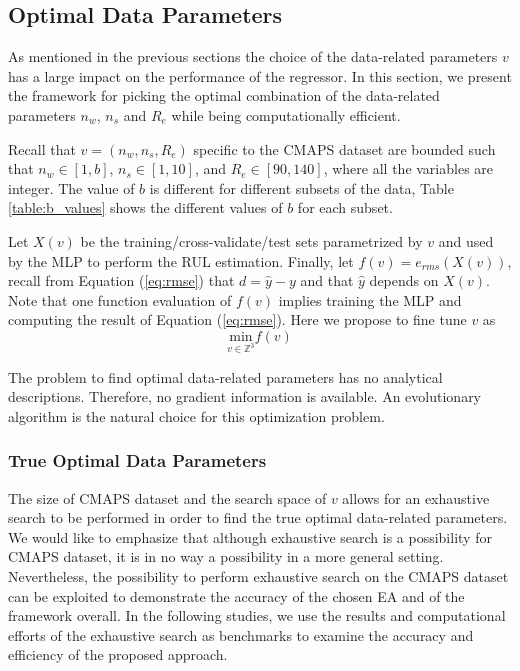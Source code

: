\documentclass[12pt]{IEEEtran}%
\begin{document}
\subsection{Optimal Data Parameters}

\label{sec:otimal_data_params}

As mentioned in the previous sections the choice of the data-related
parameters $v$ has a large impact on the performance of the regressor. In this
section, we present the framework for picking the optimal combination of the
data-related parameters $n_{w}$, $n_{s}$ and $R_{e}$ while being
computationally efficient.

Recall that $v = (n_{w}, n_{s}, R_{e})$ specific to the CMAPS dataset are
bounded such that $n_{w} \in\left[  1, b\right]  $, $n_{s} \in\left[  1,
10\right]  $, and $R_{e} \in\left[  90, 140 \right]  $, where all the
variables are integer. The value of $b$ is different for different subsets of
the data, Table \ref{table:b_values} shows the different values of $b$ for
each subset.

Let $X(v)$ be the training/cross-validate/test sets parametrized by $v$ and
used by the MLP to perform the RUL estimation. Finally, let $f(v)=e_{rms}%
(X(v))$, recall from Equation (\ref{eq:rmse}) that $d = \hat{y} - y$ and that
$\hat{y}$ depends on $X(v)$. Note that one function evaluation of $f(v)$
implies training the MLP and computing the result of Equation (\ref{eq:rmse}).
Here we propose to fine tune $v$ as
\begin{equation}
\underset{v \in\mathbb{Z}^{3}}{\mathrm{min}} f(v)
\label{eq:optimization_problem}%
\end{equation}


The problem to find optimal data-related parameters has no analytical
descriptions. Therefore, no gradient information is available. An evolutionary
algorithm is the natural choice for this optimization problem.

\subsubsection{True Optimal Data Parameters}

The size of CMAPS dataset and the search space of $v$ allows for an exhaustive
search to be performed in order to find the true optimal data-related
parameters. We would like to emphasize that although exhaustive search is a
possibility for CMAPS dataset, it is in no way a possibility in a more general
setting. Nevertheless, the possibility to perform exhaustive search on the
CMAPS dataset can be exploited to demonstrate the accuracy of the chosen EA
and of the framework overall. In the following studies, we use the results and
computational efforts of the exhaustive search as benchmarks to examine the
accuracy and efficiency of the proposed approach.
\end{document}
